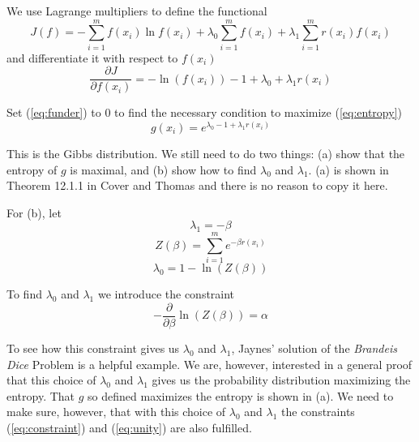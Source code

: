 \documentclass[phd,12pt,oneside]{ubcthesis}
\begin{document}
{\noindent}We use Lagrange multipliers to define the functional
\begin{equation}
  \label{eq:functional}
J(f)=-\sum_{i=1}^{m}f(x_{i})\ln{}f(x_{i})+\lambda_{0}\sum_{i=1}^{m}f(x_{i})+\lambda_{1}\sum_{i=1}^{m}r(x_{i})f(x_{i})
\end{equation}
{\noindent}and differentiate it with respect to $f(x_{i})$
\begin{equation}
  \label{eq:funder}
\frac{\partial{}J}{\partial{}f(x_{i})}=-\ln(f(x_{i}))-1+\lambda_{0}+\lambda_{1}r(x_{i})
\end{equation}

{\noindent}Set ({\ref{eq:funder}}) to $0$ to find the necessary condition to
maximize ({\ref{eq:entropy}})
\begin{equation}
  \label{eq:coverthomas}
g(x_{i})=e^{\lambda_{0}-1+\lambda_{1}r(x_{i})}
\end{equation}

{\noindent}This is the Gibbs distribution. We still need to do two things: (a)
show that the entropy of $g$ is maximal, and (b) show how to find
$\lambda_{0}$ and $\lambda_{1}$. (a) is shown in Theorem 12.1.1 in
Cover and Thomas  and there is no reason to
copy it here. 

For (b), let
\begin{equation}
  \label{eq:l1}
\lambda_{1}=-\beta
\end{equation}
\begin{equation}
  \label{eq:zet}
Z(\beta)=\sum_{i=1}^{m}e^{-\beta{}r(x_{i})}
\end{equation}
\begin{equation}
  \label{eq:l0}
\lambda_{0}=1-\ln(Z(\beta))
\end{equation}

{\noindent}To find $\lambda_{0}$ and $\lambda_{1}$ we introduce the constraint
\begin{equation}
  \label{eq:logcon}
-\frac{\partial}{\partial{}\beta}\ln(Z(\beta))=\alpha
\end{equation}

To see how this constraint gives us $\lambda_{0}$ and $\lambda_{1}$,
Jaynes' solution of the \emph{Brandeis Dice} Problem is a helpful
example. We are, however, interested in a general proof that this
choice of $\lambda_{0}$ and $\lambda_{1}$ gives us the probability
distribution maximizing the entropy. That $g$ so defined maximizes the
entropy is shown in (a). We need to make sure, however, that with this
choice of $\lambda_{0}$ and $\lambda_{1}$ the constraints
({\ref{eq:constraint}}) and ({\ref{eq:unity}}) are also fulfilled.
\end{document}
